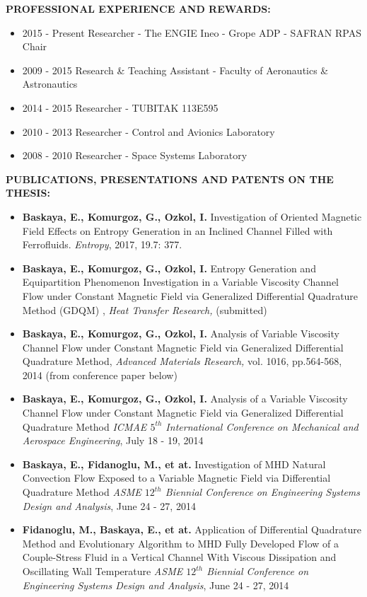 \textbf{PROFESSIONAL EXPERIENCE AND REWARDS:}   
\vspace{-3mm}
\begin{itemize}
  \item 2015 - Present Researcher - The ENGIE Ineo - Grope ADP - SAFRAN RPAS Chair
  \item 2009 - 2015 Research  \& Teaching Assistant - Faculty of Aeronautics \& \\Astronautics
  \item 2014 - 2015 Researcher - TUBITAK 113E595
  \item 2010 - 2013 Researcher - Control and Avionics Laboratory
  \item 2008 - 2010 Researcher - Space Systems Laboratory
\end{itemize}

\textbf{PUBLICATIONS, PRESENTATIONS AND PATENTS ON THE THESIS:} 
\vspace{-3mm}
\begin{itemize}
   
   \item \textbf{Baskaya, E., Komurgoz, G., Ozkol, I.} Investigation of Oriented Magnetic Field Effects on Entropy Generation in an Inclined Channel Filled with Ferrofluids.  \textit{Entropy}, 2017, 19.7: 377.

   \item \textbf{Baskaya, E., Komurgoz, G., Ozkol, I.} Entropy Generation and Equipartition Phenomenon Investigation in a Variable Viscosity Channel Flow under Constant Magnetic Field via Generalized Differential Quadrature Method (GDQM) ,  \textit{Heat Transfer Research,} (submitted)
   
    \item \textbf{Baskaya, E., Komurgoz, G., Ozkol, I.} Analysis of Variable Viscosity Channel Flow under Constant Magnetic Field via Generalized Differential Quadrature Method, \textit{Advanced Materials Research,} vol. 1016, pp.564-568, 2014 (from conference paper below)

    \item \textbf{Baskaya, E., Komurgoz, G., Ozkol, I.} Analysis of a Variable Viscosity Channel Flow under Constant Magnetic Field via Generalized Differential Quadrature Method \textit{ ICMAE $5^{th}$ International Conference on Mechanical and Aerospace Engineering}, July 18 - 19, 2014 

     \item \textbf{Baskaya, E., Fidanoglu, M., et at.} Investigation of MHD Natural Convection Flow Exposed to a Variable Magnetic Field via Differential Quadrature Method \textit{ ASME $12^{th}$ Biennial Conference on Engineering Systems Design and Analysis}, June 24 - 27, 2014 

     \item \textbf{Fidanoglu, M., Baskaya, E., et at.} Application of Differential Quadrature Method and Evolutionary Algorithm to MHD Fully Developed Flow of a Couple-Stress Fluid in a Vertical Channel With Viscous Dissipation and Oscillating Wall Temperature \textit{ ASME $12^{th}$ Biennial Conference on Engineering Systems Design and Analysis}, June 24 - 27, 2014 

\end{itemize}

